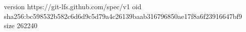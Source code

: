 version https://git-lfs.github.com/spec/v1
oid sha256:bc598532b582c6d6d9c5d79a4c26139baab316796850ae17f8a6f23916647bf9
size 262240
